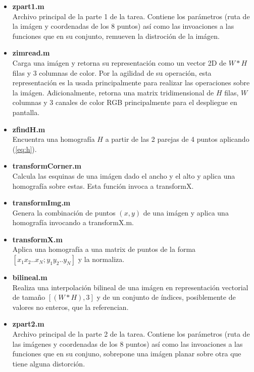 \documentclass{IEEEtran}
\begin{document}
\begin{itemize}
\item \textbf{zpart1.m} ~\\
Archivo principal de la parte 1 de la tarea.
Contiene los parámetros (ruta de la imágen y coordenadas de los 8 puntos)
así como las invoaciones a las funciones que en su conjunto, remueven
la distroción de la imágen.

\item \textbf{zimread.m} ~\\
Carga una imágen y retorna su representación como un vector 2D de
$W*H$ filas y 3 columnas de color. Por la agilidad de su operación,
esta representación es la usada principalmente para realizar 
las operaciones sobre la imágen.
Adicionalmente, retorna una matrix tridimensional 
de $H$ filas, $W$ columnas y 3 canales de color RGB principalmente
para el despliegue en pantalla.

\item \textbf{zfindH.m} ~\\
Encuentra una homografía $H$ a partir de las 2 parejas de 4
puntos aplicando (\ref{eq:h}).

\item \textbf{transformCorner.m} ~\\
Calcula las esquinas de una imágen dado el ancho y el alto
y aplica una homografía sobre estas. Esta función invoca a transformX.

\item \textbf{transformImg.m} ~\\
Genera la combinación de puntos $(x,y)$ de una imágen y aplica
una homografía invocando a transformX.m.

\item \textbf{transformX.m} ~\\
Aplica una homografía a una matrix de puntos de la forma
$[x_1 x_2 .. x_N; y_1 y_2 .. y_N]$ y la normaliza.

\item \textbf{bilineal.m} ~\\
Realiza una interpolación bilineal de una imágen en representación
vectorial de tamaño $[(W*H) , 3]$ y de un conjunto de índices, posiblemente
de valores no enteros, que la referencian.

\item \textbf{zpart2.m} ~\\
Archivo principal de la parte 2 de la tarea.
Contiene los parámetros (ruta de las imágenes y coordenadas de los 8 puntos)
así como las invoaciones a las funciones que en su conjuno, sobrepone
una imágen planar sobre otra que tiene alguna distorción.

\end{itemize} 
\end{document}
